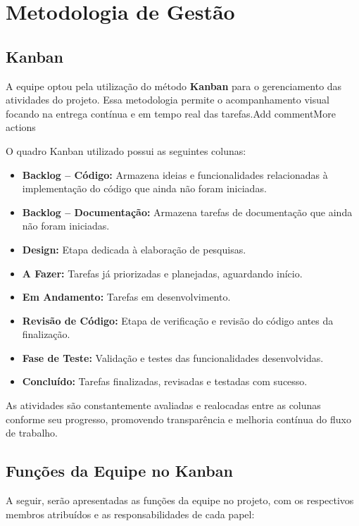 \documentclass[
	12pt,				%
	openany,			%
	twoside,			%
	a4paper,			%
	english,			%
	brazil				%
	]{abntex2}
\begin{document}
\section{Metodologia de Gestão}

\subsection{Kanban}

A equipe optou pela utilização do método \textbf{Kanban} para o gerenciamento das atividades do projeto. Essa metodologia permite o acompanhamento visual focando na entrega contínua e em tempo real das tarefas.Add commentMore actions

O quadro Kanban utilizado possui as seguintes colunas:

\begin{itemize}
    \item \textbf{Backlog – Código:} Armazena ideias e funcionalidades relacionadas à implementação do código que ainda não foram iniciadas.
    \item \textbf{Backlog – Documentação:} Armazena tarefas de documentação que ainda não foram iniciadas.
    \item \textbf{Design:} Etapa dedicada à elaboração de pesquisas.
    \item \textbf{A Fazer:} Tarefas já priorizadas e planejadas, aguardando início.
    \item \textbf{Em Andamento:} Tarefas em desenvolvimento.
    \item \textbf{Revisão de Código:} Etapa de verificação e revisão do código antes da finalização.
    \item \textbf{Fase de Teste:} Validação e testes das funcionalidades desenvolvidas.
    \item \textbf{Concluído:} Tarefas finalizadas, revisadas e testadas com sucesso.
\end{itemize}

As atividades são constantemente avaliadas e realocadas entre as colunas conforme seu progresso, promovendo transparência e melhoria contínua do fluxo de trabalho.

\subsection{Funções da Equipe no Kanban}

A seguir, serão apresentadas as funções da equipe no projeto, com os respectivos membros atribuídos e as responsabilidades de cada papel:
\end{document}
